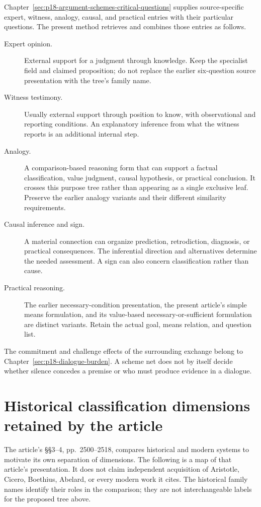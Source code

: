 Chapter~\ref{sec:p18-argument-schemes-critical-questions} supplies
source-specific expert, witness, analogy, causal, and practical
entries with their particular questions.
The present method retrieves and combines those entries as follows.
\begin{description}
\item[Expert opinion.] External support for a judgment through knowledge.
Keep the specialist field and claimed proposition; do not replace
the earlier six-question source presentation with the tree's family name.
\item[Witness testimony.] Usually external support through position
to know, with observational and reporting conditions.
An explanatory inference from what the witness reports is an
additional internal step.
\item[Analogy.] A comparison-based reasoning form that can support
a factual classification, value judgment, causal hypothesis,
or practical conclusion. It crosses this purpose tree rather than
appearing as a single exclusive leaf. Preserve the earlier analogy
variants and their different similarity requirements.
\item[Causal inference and sign.] A material connection can organize
prediction, retrodiction, diagnosis, or practical consequences.
The inferential direction and alternatives determine the needed
assessment. A sign can also concern classification rather than cause.
\item[Practical reasoning.] The earlier necessary-condition presentation,
the present article's simple means formulation, and its value-based
necessary-or-sufficient formulation are distinct variants.
Retain the actual goal, means relation, and question list.
\end{description}

The commitment and challenge effects of the surrounding exchange
belong to Chapter~\ref{sec:p18-dialogue-burden}.
A scheme net does not by itself decide whether silence concedes
a premise or who must produce evidence in a dialogue.

\section{Historical classification dimensions retained by the article}
\label{sec:p18-scheme-classification-history}

The article's \S\S3--4, pp.~2500--2518, compares historical and modern
systems to motivate its own separation of dimensions.
The following is a map of that article's presentation.
It does not claim independent acquisition of Aristotle, Cicero,
Boethius, Abelard, or every modern work it cites.
The historical family names identify their roles in the comparison;
they are not interchangeable labels for the proposed tree above.

